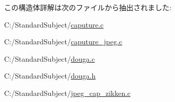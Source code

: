 この構造体詳解は次のファイルから抽出されました\+:\begin{DoxyCompactItemize}
\item 
C\+:/\+Standard\+Subject/\hyperlink{caputure_8c}{caputure.\+c}\item 
C\+:/\+Standard\+Subject/\hyperlink{caputure__jpeg_8c}{caputure\+\_\+jpeg.\+c}\item 
C\+:/\+Standard\+Subject/\hyperlink{douga_8c}{douga.\+c}\item 
C\+:/\+Standard\+Subject/\hyperlink{douga_8h}{douga.\+h}\item 
C\+:/\+Standard\+Subject/\hyperlink{jpeg__cap__zikken_8c}{jpeg\+\_\+cap\+\_\+zikken.\+c}\end{DoxyCompactItemize}
